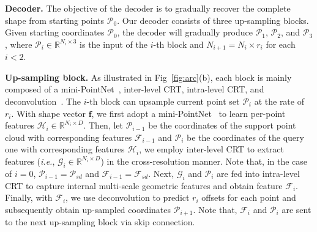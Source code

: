 \documentclass[letterpaper]{article} %
\newcommand{\ve}[1]{\mathbf{#1}} %
\begin{document}
{\bf Decoder.}
The objective of the decoder is to gradually recover the complete shape from starting points $\mathcal{P}_0$.
Our decoder consists of three up-sampling blocks.
Given starting coordinates ${\mathcal  P}_0$, the decoder will gradually produce ${\mathcal P}_1$, ${\mathcal P}_2$, and ${\mathcal P}_3$,  where ${\mathcal P}_{i} \in \mathbb{R}^{N_i \times 3}$ is the input of the $i$-th block and $N_{i+1}=N_{i} \times r_i$ for each $i<2$.

{\bf Up-sampling block.}
As illustrated in Fig~\ref{fig:arc}(b), each block is mainly composed of a mini-PointNet~\cite{qi2017pointnet}, inter-level CRT, intra-level CRT, and deconvolution~\cite{xiang2021snowflakenet}.
The $i$-th block can upsample current point set $\mathcal{P}_{i}$ at the rate of $r_i$.
With shape vector $\ve f$,  we first adopt a mini-PointNet~\cite{qi2017pointnet} to learn per-point features $\mathcal{H}_i \in \mathbb{R}^{N_i \times D}$.
Then, let $\mathcal{P}_{i-1}$ be the coordinates of the support point cloud with corresponding features $\mathcal{F}_{i-1}$ and $\mathcal{P}_{i}$ be the coordinates of the query one with corresponding features $\mathcal{H}_{i}$,  we employ inter-level CRT to extract features ({\em i.e.}, ${{\mathcal G}_i \in {\mathbb R}^{N_i \times D}}$) in the cross-resolution manner.
Note that, in the case of $i=0$, ${\mathcal P}_{i-1}={\mathcal P}_{sd}$ and ${\mathcal F}_{i-1}={\mathcal F}_{sd}$.
Next, ${\mathcal G}_i$ and ${\mathcal P}_i$ are fed into intra-level CRT to capture internal multi-scale geometric features and obtain feature $\mathcal{F}_i$. Finally, with $\mathcal{F}_i$, we use deconvolution to predict $r_i$ offsets for each point and subsequently obtain up-sampled coordinates ${\mathcal P}_{i+1}$.
Note that, $\mathcal{F}_i$ and $\mathcal{P}_i$ are sent to the next up-sampling block via skip connection.
\end{document}
